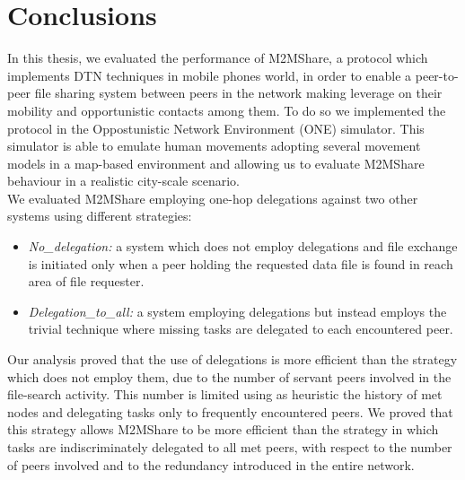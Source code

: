 
\chapter{Conclusions}\label{conclusioni} %





In this thesis, we evaluated the performance of M2MShare, a protocol which implements DTN techniques in mobile phones world, in order to enable a peer-to-peer file sharing system between peers in the network  making leverage on their mobility and opportunistic contacts among them. To do so we implemented the protocol in the Oppostunistic Network Environment (ONE) simulator. This simulator is able to emulate human movements adopting several movement models in a map-based environment and allowing us to evaluate M2MShare behaviour in a realistic city-scale scenario.
\\

We evaluated M2MShare employing one-hop delegations against two other systems using different strategies:
\begin{itemize}
\item \textit{No\_delegation:} a system which does not employ delegations and file exchange is initiated only when a peer holding the requested data file is found in reach area of file requester.
\item \textit{Delegation\_to\_all:} a system employing delegations but instead employs the trivial technique where missing tasks are delegated to each encountered peer.
\end{itemize}
Our analysis proved that the use of delegations is more efficient than the strategy which does not employ them, due to the number of servant peers involved in the file-search activity. This number is limited using as heuristic the history of met nodes and delegating tasks only to frequently encountered peers. We proved that this strategy allows M2MShare to be more efficient than the strategy in which tasks are indiscriminately delegated to all met peers, with respect to the number of peers involved and to the redundancy introduced in the entire network.
\\

